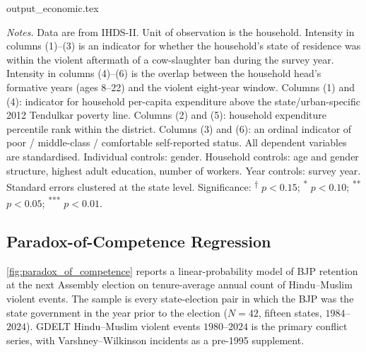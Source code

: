\documentclass[11pt,twoside]{extarticle}
\begin{document}
\begin{table}[!htbp]
\centering
\caption{\bf Short- and Long-Term Poverty of Muslim Households Exposed to Cow-Slaughter Bans}
\label{Table:economic}\label{tab:economic}
\begin{threeparttable}
    \onehalfspacing
    {output_economic.tex}
    \begin{tablenotes}
        \footnotesize
        \textit{Notes.}
        Data are from IHDS-II. Unit of observation is the household.
        Intensity in columns (1)--(3) is an indicator for whether the
        household's state of residence was within the violent aftermath of a
        cow-slaughter ban during the survey year. Intensity in columns
        (4)--(6) is the overlap between the household head's formative years
        (ages 8--22) and the violent eight-year window. Columns (1) and (4):
        indicator for household per-capita expenditure above the
        state/urban-specific 2012 Tendulkar poverty line. Columns (2) and
        (5): household expenditure percentile rank within the district.
        Columns (3) and (6): an ordinal indicator of poor / middle-class /
        comfortable self-reported status. All dependent variables are
        standardised. Individual controls: gender. Household controls: age
        and gender structure, highest adult education, number of workers.
        Year controls: survey year. Standard errors clustered at the state
        level. Significance:
        \textsuperscript{$\dagger$} $p < 0.15$;
        \textsuperscript{*} $p < 0.10$;
        \textsuperscript{**} $p < 0.05$;
        \textsuperscript{***} $p < 0.01$.
    \end{tablenotes}
\end{threeparttable}
\end{table}

\subsection{Paradox-of-Competence Regression}\label{app:paradox_regression}

\autoref{fig:paradox_of_competence} reports a linear-probability model of
BJP retention at the next Assembly election on tenure-average annual count
of Hindu--Muslim violent events. The sample is every state-election pair in
which the BJP was the state government in the year prior to the election
($N=42$, fifteen states, $1984$--$2024$). GDELT Hindu--Muslim violent
events $1980$--$2024$ is the primary conflict series, with
Varshney--Wilkinson incidents as a pre-1995 supplement.
\end{document}
